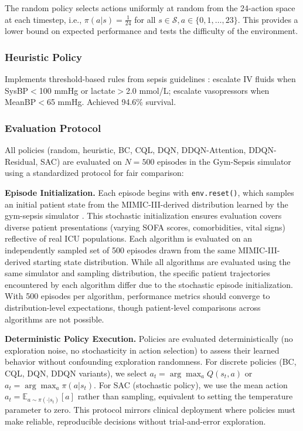 The random policy selects actions uniformly at random from the 24-action space at each timestep, i.e., $\pi(a|s) = \frac{1}{24}$ for all $s \in \mathcal{S}, a \in \{0, 1, \ldots, 23\}$. This provides a lower bound on expected performance and tests the difficulty of the environment.

\subsubsection{Heuristic Policy}

Implements threshold-based rules from sepsis guidelines \citep{rhodes2017ssc}: escalate IV fluids when SysBP$<$100 mmHg or lactate$>$2.0 mmol/L; escalate vasopressors when MeanBP$<$65 mmHg. Achieved 94.6\% survival.

\subsubsection{Evaluation Protocol}

All policies (random, heuristic, BC, CQL, DQN, DDQN-Attention, DDQN-Residual, SAC) are evaluated on $N = 500$ episodes in the Gym-Sepsis simulator using a standardized protocol for fair comparison:

\textbf{Episode Initialization.} Each episode begins with \texttt{env.reset()}, which samples an initial patient state from the MIMIC-III-derived distribution learned by the gym-sepsis simulator \citep{raghu2017sepsis_drl}. This stochastic initialization ensures evaluation covers diverse patient presentations (varying SOFA scores, comorbidities, vital signs) reflective of real ICU populations. Each algorithm is evaluated on an independently sampled set of 500 episodes drawn from the same MIMIC-III-derived starting state distribution. While all algorithms are evaluated using the same simulator and sampling distribution, the specific patient trajectories encountered by each algorithm differ due to the stochastic episode initialization. With 500 episodes per algorithm, performance metrics should converge to distribution-level expectations, though patient-level comparisons across algorithms are not possible.

\textbf{Deterministic Policy Execution.} Policies are evaluated deterministically (no exploration noise, no stochasticity in action selection) to assess their learned behavior without confounding exploration randomness. For discrete policies (BC, CQL, DQN, DDQN variants), we select $a_t = \arg\max_a Q(s_t, a)$ or $a_t = \arg\max_a \pi(a|s_t)$. For SAC (stochastic policy), we use the mean action $a_t = \mathbb{E}_{a \sim \pi(\cdot|s_t)}[a]$ rather than sampling, equivalent to setting the temperature parameter to zero. This protocol mirrors clinical deployment where policies must make reliable, reproducible decisions without trial-and-error exploration.

